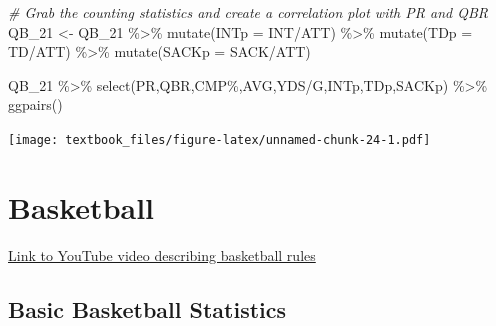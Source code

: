 \documentclass[
  11pt,
]{book}
\newenvironment{Shaded}{\begin{snugshade}}{\end{snugshade}}
\newcommand{\AttributeTok}[1]{\textcolor[rgb]{0.77,0.63,0.00}{#1}}
\newcommand{\CommentTok}[1]{\textcolor[rgb]{0.56,0.35,0.01}{\textit{#1}}}
\newcommand{\FunctionTok}[1]{\textcolor[rgb]{0.00,0.00,0.00}{#1}}
\newcommand{\NormalTok}[1]{#1}
\newcommand{\OtherTok}[1]{\textcolor[rgb]{0.56,0.35,0.01}{#1}}
\newcommand{\SpecialCharTok}[1]{\textcolor[rgb]{0.00,0.00,0.00}{#1}}
\newcommand{\StringTok}[1]{\textcolor[rgb]{0.31,0.60,0.02}{#1}}
\theoremstyle{definition}
\theoremstyle{definition}
\theoremstyle{definition}
\theoremstyle{definition}
\theoremstyle{remark}
\begin{document}
\begin{Shaded}
\begin{Highlighting}[]
\CommentTok{\# Grab the counting statistics and create a correlation plot with PR and QBR}
\NormalTok{QB\_21 }\OtherTok{\textless{}{-}}\NormalTok{ QB\_21 }\SpecialCharTok{\%\textgreater{}\%} 
  \FunctionTok{mutate}\NormalTok{(}\AttributeTok{INTp =}\NormalTok{ INT}\SpecialCharTok{/}\NormalTok{ATT) }\SpecialCharTok{\%\textgreater{}\%}
  \FunctionTok{mutate}\NormalTok{(}\AttributeTok{TDp =}\NormalTok{ TD}\SpecialCharTok{/}\NormalTok{ATT) }\SpecialCharTok{\%\textgreater{}\%}
  \FunctionTok{mutate}\NormalTok{(}\AttributeTok{SACKp =}\NormalTok{ SACK}\SpecialCharTok{/}\NormalTok{ATT)}

\NormalTok{QB\_21 }\SpecialCharTok{\%\textgreater{}\%} \FunctionTok{select}\NormalTok{(PR,QBR,}\StringTok{\textasciigrave{}}\AttributeTok{CMP\%}\StringTok{\textasciigrave{}}\NormalTok{,AVG,}\StringTok{\textasciigrave{}}\AttributeTok{YDS/G}\StringTok{\textasciigrave{}}\NormalTok{,INTp,TDp,SACKp) }\SpecialCharTok{\%\textgreater{}\%} \FunctionTok{ggpairs}\NormalTok{()}
\end{Highlighting}
\end{Shaded}

\texttt{[image: textbook\_files/figure-latex/unnamed-chunk-24-1.pdf]}

\newpage

\hypertarget{basketball}{%
\section{Basketball}\label{basketball}}

\href{https://www.youtube.com/watch?v=wYjp2zoqQrs}{Link to YouTube video describing basketball rules}

\hypertarget{basic-basketball-statistics}{%
\subsection{Basic Basketball Statistics}\label{basic-basketball-statistics}}
\end{document}
